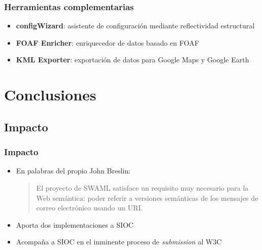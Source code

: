 \documentclass[spanish,notes=hide]{beamer}
\begin{document}
{
  \frametitle{Herramientas complementarias}

  \begin{itemize}
   \item<1-> \textbf{configWizard}: asistente de configuración mediante reflectividad estructural
   \item<2-> \textbf{FOAF Enricher}: enriquecedor de datos basado en FOAF
   \item<3-> \textbf{KML Exporter}: exportación de datos para Google Maps y Google Earth
  \end{itemize}

  \begin{center}
  \end{center}

}

\section{Conclusiones}
\subsection{Impacto}
\frame
{
  \frametitle{Impacto}

  \begin{itemize}
   \item<1-> En palabras del propio John Breslin:
	\begin{quotation}
 	  El proyecto de SWAML satisface un requisito muy necesario para la Web semántica: 
	  poder referir a versiones semánticas de los mensajes de correo electrónico usando
	  un URI.
	\end{quotation}
   \item<2-> Aporta dos implementaciones a SIOC
   \item<3-> Acompaña a SIOC en el inminente proceso de \textit{submission} al W3C
  \end{itemize}

}
\end{document}

